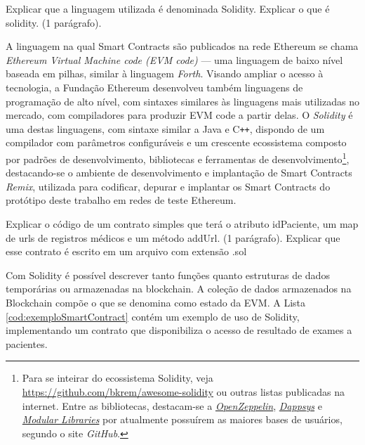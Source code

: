 \documentclass[a4paper,11pt]{article}
\begin{document}
{\color{ForestGreen}Explicar que a linguagem utilizada é denominada Solidity. Explicar o que é solidity. (1 parágrafo).}

A linguagem na qual Smart Contracts são publicados na rede Ethereum se chama \emph{Ethereum Virtual Machine code (EVM code)} --- uma linguagem de baixo nível baseada em pilhas, similar à linguagem \emph{Forth}.
Visando ampliar o acesso à tecnologia, a Fundação Ethereum desenvolveu também linguagens de programação de alto nível, com sintaxes similares às linguagens mais utilizadas no mercado, com compiladores para produzir EVM code a partir delas. O \emph{Solidity} é uma destas linguagens, com sintaxe similar a Java e C\texttt{++}, dispondo de um compilador com parâmetros configuráveis e um crescente ecossistema composto por padrões de desenvolvimento, bibliotecas e ferramentas de desenvolvimento\footnote{Para se inteirar do ecossistema Solidity, veja \href{https://github.com/bkrem/awesome-solidity}{https://github.com/bkrem/awesome-solidity} ou outras listas publicadas na internet. Entre as bibliotecas, destacam-se a \emph{\href{https://openzeppelin.com/}{OpenZeppelin}}, \emph{\href{https://github.com/dapphub/dappsys}{Dappsys}} e \emph{\href{https://github.com/modular-network/ethereum-libraries}{Modular Libraries}} por atualmente possuírem as maiores bases de usuários, segundo o site \emph{GitHub}.}, destacando-se o ambiente de desenvolvimento e implantação de Smart Contracts \emph{Remix}, utilizada para codificar, depurar e implantar os Smart Contracts do protótipo deste trabalho em redes de teste Ethereum.

{\color{ForestGreen}Explicar o código de um contrato simples que terá o atributo idPaciente, um map de urls de registros médicos e um método addUrl. (1 parágrafo). Explicar que esse contrato é escrito em um arquivo com extensão .sol}

Com Solidity é possível descrever tanto funções quanto estruturas de dados temporárias ou armazenadas na blockchain.
A coleção de dados armazenados na Blockchain compõe o que se denomina como estado da EVM. A Lista \ref{cod:exemploSmartContract} contém um exemplo de uso de Solidity, implementando um contrato que disponibiliza o acesso de resultado de exames a pacientes.
\end{document}
